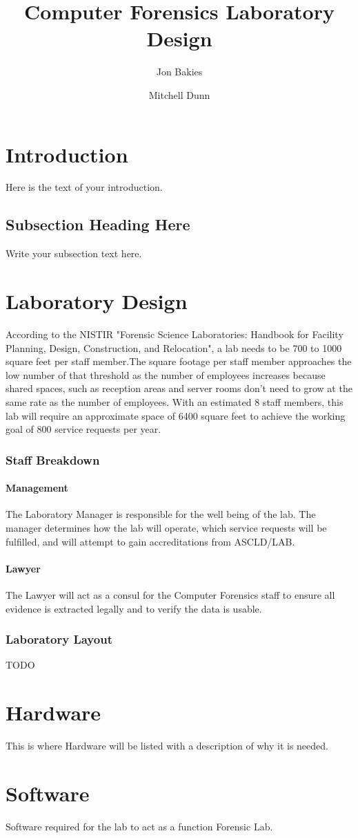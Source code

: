 \documentclass{article}
\begin{document}
\title{Computer Forensics Laboratory Design}
\author{Jon Bakies \and Mitchell Dunn} 

\maketitle
\newpage

\tableofcontents
\newpage

\section{Introduction}
Here is the text of your introduction.

\subsection{Subsection Heading Here}
Write your subsection text here.

\section{Laboratory Design}

According to the NISTIR "Forensic Science Laboratories: Handbook for Facility Planning, Design, Construction, and Relocation", a lab needs to be 700 to 1000 square feet per staff member.The square footage per staff member approaches the low number of that threshold as the number of employees increases because shared spaces, such as reception areas and server rooms don't need to grow at the same rate as the number of employees.  With an estimated 8 staff members, this lab will require an approximate space of 6400 square feet to achieve the working goal of 800 service requests per year.

\subsubsection{Staff Breakdown}
\paragraph {Management} The Laboratory Manager is responsible for the well being of the lab.  The manager determines how the lab will operate, which service requests will be fulfilled, and will attempt to gain accreditations from ASCLD/LAB.
 
\paragraph{Lawyer} The Lawyer will act as a consul for the Computer Forensics staff to ensure all evidence is extracted legally and to verify the data is usable.  
\subsubsection{Laboratory Layout}
TODO


\section{Hardware}
This is where Hardware will be listed with a description of why it is needed.

\section{Software}
Software required for the lab to act as a function Forensic Lab.
\end{document}
